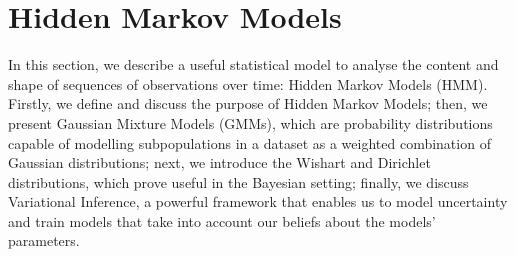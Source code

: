 \documentclass[../main.tex]{subfiles}
\begin{document}
\section{Hidden Markov Models} \label{section_hmm}
In this section, we describe a useful statistical model to analyse the content and shape of sequences of observations over time: Hidden Markov Models (HMM). Firstly, we define and discuss the purpose of Hidden Markov Models; then, we present Gaussian Mixture Models (GMMs), which are probability distributions capable of modelling subpopulations in a dataset as a weighted combination of Gaussian distributions; next, we introduce the Wishart and Dirichlet distributions, which prove useful in the Bayesian setting; finally, we discuss Variational Inference, a powerful framework that enables us to model uncertainty and train models that take into account our beliefs about the models' parameters.
\end{document}
